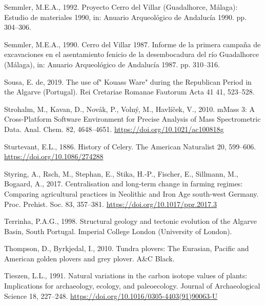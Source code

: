 \documentclass[3p]{elsarticle} %
\newlength{\cslhangindent}
\newlength{\cslentryspacingunit} %
\newenvironment{CSLReferences}[2] %
 {%
  \setlength{\parindent}{0pt}
  \ifodd #1
  \let\oldpar\par
  \def\par{\hangindent=\cslhangindent\oldpar}
  \fi
  \setlength{\parskip}{#2\cslentryspacingunit}
 }%
 {}
\begin{document}
\begin{CSLReferences}{1}{0}
\leavevmode{}%
Semmler, M.E.A., 1992. Proyecto {Cerro} del {Villar} ({Guadalhorce}, {Málaga}): Estudio de materiales 1990, in: Anuario Arqueológico de {Andalucía} 1990. pp. 304--306.

\leavevmode{}%
Semmler, M.E.A., 1990. Cerro del {Villar} 1987. {Informe} de la primera campaña de excavaciones en el asentamiento fenicio de la desembocadura del río {Guadalhorce} ({Málaga}), in: Anuario Arqueológico de {Andalucía} 1987. pp. 310--316.

\leavevmode{}%
Sousa, E. de, 2019. The use of" {Kouass Ware}" during the {Republican Period} in the {Algarve} ({Portugal}). Rei Cretariae Romanae Fautorum Acta 41 41, 523--528.

\leavevmode{}%
Strohalm, M., Kavan, D., Novák, P., Volný, M., Havlíček, V., 2010. {mMass} 3: A {Cross}-{Platform Software Environment} for {Precise Analysis} of {Mass Spectrometric Data}. Anal. Chem. 82, 4648--4651. \url{https://doi.org/10.1021/ac100818g}

\leavevmode{}%
Sturtevant, E.L., 1886. History of {Celery}. The American Naturalist 20, 599--606. \url{https://doi.org/10.1086/274288}

\leavevmode{}%
Styring, A., Rsch, M., Stephan, E., Stika, H.-P., Fischer, E., Sillmann, M., Bogaard, A., 2017. Centralisation and long-term change in farming regimes: Comparing agricultural practices in {Neolithic} and {Iron Age} south-west {Germany}. Proc. Prehist. Soc. 83, 357--381. \url{https://doi.org/10.1017/ppr.2017.3}

\leavevmode{}%
Terrinha, P.A.G., 1998. Structural geology and tectonic evolution of the {Algarve Basin}, {South Portugal}. {Imperial College London (University of London)}.

\leavevmode{}%
Thompson, D., Byrkjedal, I., 2010. Tundra plovers: The {Eurasian}, {Pacific} and {American} golden plovers and grey plover. {A\&C Black}.

\leavevmode{}%
Tieszen, L.L., 1991. Natural variations in the carbon isotope values of plants: {Implications} for archaeology, ecology, and paleoecology. Journal of Archaeological Science 18, 227--248. \url{https://doi.org/10.1016/0305-4403(91)90063-U}


\end{CSLReferences}
\end{document}

